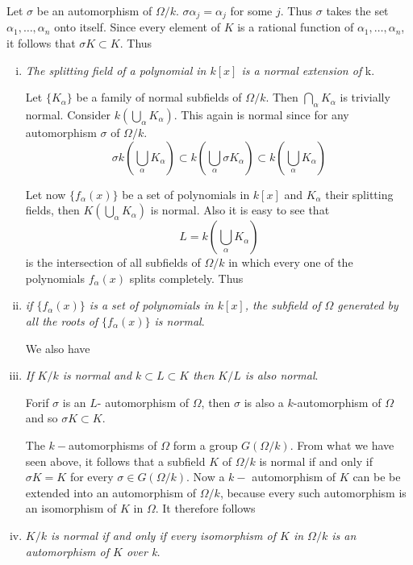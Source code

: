 Let $\sigma$ be an automorphism of $ \Omega /k$. $ \sigma \alpha_j =
\alpha_j $ for some $ j$. Thus $ \sigma $ takes the set $ \alpha_1 ,
\ldots , \alpha_n $ onto itself. Since every element of $K$ is a
rational function of $\alpha_1 , \ldots , \alpha_n $, it follows
that $\sigma K \subset K $. Thus 
\begin{enumerate}[i)]
\item \textit{The splitting field of a polynomial in $ k [ x ] $ is
  a normal extension of} k. 

Let $ \{ K_\alpha \} $ be a  family of normal subfields of $ \Omega /
k $. Then $\bigcap\limits_{\alpha} K_\alpha $ is trivially
normal. Consider $k (\bigcup \limits_{\alpha} K_\alpha ) $. This
again is normal since for any automorphism $\sigma$ of $ \Omega /k $. 
$$
\sigma k \left( \bigcup_{\alpha} K_{\alpha} \right)  \subset k \left(
\bigcup_{\alpha} \sigma K_{\alpha} \right) \subset k \left(
\bigcup_{\alpha} K_\alpha \right)   
$$

Let now $ \{ f_\alpha (x) \} $ be a set of polynomials in $ k [ x ] $
and $ K_\alpha $ their splitting fields, then $ K (
\bigcup\limits_{\alpha} K_{\alpha} ) $ is normal. Also it is easy to
see that   
$$
L = k  \left( \bigcup_{\alpha} K_\alpha \right) 
$$
is the intersection of all subfields of $\Omega /k $  in which every
one of the polynomials $f_\alpha (x) $ splits completely. Thus 

 \item  \textit{if $ \{ f _\alpha (x) \} $  is a set of polynomials in
   $ k [ x ] $, the subfield of $ \Omega $  generated by all the roots
   of  $ \{ f_\alpha (x) \} $ is normal}. 
 
 We also have 

 \item \textit{ If  $K/k$  is normal and $k \subset L \subset K$ then
   $K/ L$  is also normal}. 

For\pageoriginale if $\sigma$ is an $L$- automorphism of $\Omega$,
then $\sigma$ is also a $k$-automor\-phism of $\Omega$ and so $\sigma K
\subset K$.   

The $k-$automorphisms of $\Omega $ form a group $G ( \Omega /k )
$. From what we have seen above, it follows that a subfield $K$  of
$\Omega /k $  is normal if and only if $ \sigma K =K $ for every $
\sigma \in G ( \Omega /k ) $. Now a $k-$ automorphism of $ K $ can be
be  extended into an automorphism of $ \Omega /k $, because every such
automorphism is an isomorphism of $K$ in $ \Omega $. It therefore
follows 

\item \textit{$K/k $ is normal if and only if every isomorphism of $K$
  in $\Omega /k $  is an automorphism of $K$ over k.} 
\end{enumerate}

